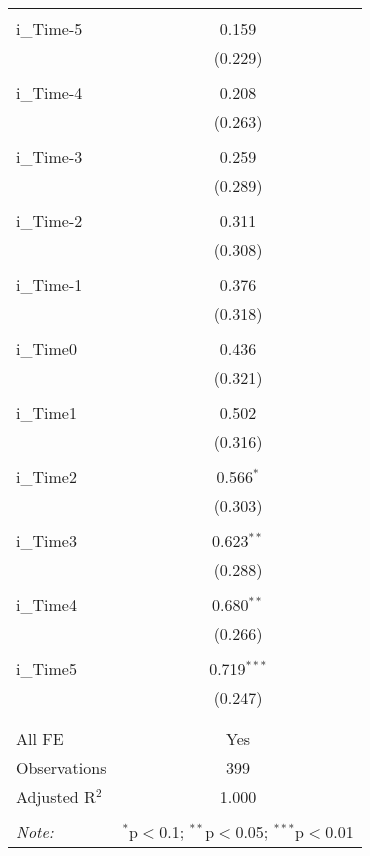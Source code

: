 
\begin{table}[!htbp] \centering 
  \caption{} 
  \label{} 
\begin{tabular}{@{\extracolsep{5pt}}lc} 
\\[-1.8ex]\hline 
\hline \\[-1.8ex] 
 i\_Time-5 & 0.159 \\ 
  & (0.229) \\ 
  & \\ 
 i\_Time-4 & 0.208 \\ 
  & (0.263) \\ 
  & \\ 
 i\_Time-3 & 0.259 \\ 
  & (0.289) \\ 
  & \\ 
 i\_Time-2 & 0.311 \\ 
  & (0.308) \\ 
  & \\ 
 i\_Time-1 & 0.376 \\ 
  & (0.318) \\ 
  & \\ 
 i\_Time0 & 0.436 \\ 
  & (0.321) \\ 
  & \\ 
 i\_Time1 & 0.502 \\ 
  & (0.316) \\ 
  & \\ 
 i\_Time2 & 0.566$^{*}$ \\ 
  & (0.303) \\ 
  & \\ 
 i\_Time3 & 0.623$^{**}$ \\ 
  & (0.288) \\ 
  & \\ 
 i\_Time4 & 0.680$^{**}$ \\ 
  & (0.266) \\ 
  & \\ 
 i\_Time5 & 0.719$^{***}$ \\ 
  & (0.247) \\ 
  & \\ 
\hline \\[-1.8ex] 
All FE & Yes \\ 
Observations & 399 \\ 
Adjusted R$^{2}$ & 1.000 \\ 
\hline 
\hline \\[-1.8ex] 
\textit{Note:}  & \multicolumn{1}{r}{$^{*}$p$<$0.1; $^{**}$p$<$0.05; $^{***}$p$<$0.01} \\ 
\end{tabular} 
\end{table} 

